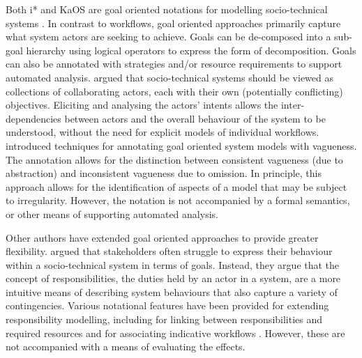 \documentclass{llncs}
\begin{document}
Both i* \citep{yu1995social} and KaOS \citep{dardenne93goal} are goal oriented notations for modelling socio-technical
systems \cite{werneck2009goreistarkaos}.  In contrast to workflows, goal oriented approaches primarily capture what
system actors are seeking to achieve.  Goals can be de-composed into a sub-goal hierarchy using logical operators to
express the form of decomposition. Goals can also be annotated with strategies and/or resource requirements to support
automated analysis.  \citet{yu1995social} argued that socio-technical systems should be viewed as collections of
collaborating actors, each with their own (potentially conflicting) objectives.  Eliciting and analysing the actors'
intents allows the inter-dependencies between actors and the overall behaviour of the system to be understood, without
the need for explicit models of individual workflows. \citet{herrmann1999vagueness} introduced techniques for annotating
goal oriented system models with vagueness.  The annotation allows for the distinction between consistent vagueness (due
to abstraction) and inconsistent vagueness due to omission.  In principle, this approach allows for the identification
of aspects of a model that may be subject to irregularity.  However, the notation is not accompanied by a formal
semantics, or other means of supporting automated analysis.

Other authors have extended goal oriented approaches to provide greater flexibility. \citet{sommerville09deriving}
argued that stakeholders often struggle to express their behaviour within a socio-technical system in terms of goals.
Instead, they argue that the concept of responsibilities, the duties held by an actor in a system, are a more intuitive
means of describing system behaviours that also capture a variety of contingencies.  Various notational features have
been provided for extending responsibility modelling, including for linking between responsibilities and required
resources and for associating indicative workflows \citep{dewsbury07responsibility}.  However, these are not accompanied
with a means of evaluating the effects.
\end{document}
